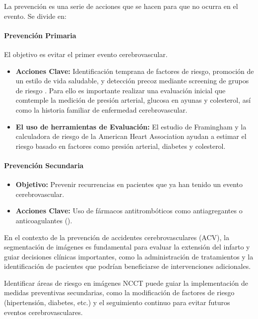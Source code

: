 La prevención es una serie de acciones que se hacen para que no ocurra en el evento. Se divide en:

\paragraph{Prevención Primaria}
El objetivo es evitar el primer evento cerebrovascular.
\begin{itemize}
    \item \textbf{Acciones Clave: } Identificación temprana de factores de riesgo, promoción de un estilo de vida saludable, y detección precoz mediante screening de grupos de riesgo \cite{incn2018}. Para ello es importante realizar una evaluación inicial que comtemple la medición de presión arterial, glucosa en ayunas y colesterol, así como la historia familiar de enfermedad cerebrovascular.

    \item \textbf{El uso de herramientas de Evaluación: } El estudio de Framingham y la calculadora de riesgo de la American Heart Association ayudan a estimar el riesgo basado en factores como presión arterial, diabetes y colesterol.
\end{itemize}

\paragraph{Prevención Secundaria}
\begin{itemize}
    \item \textbf{Objetivo:} Prevenir recurrencias en pacientes que ya han tenido un evento cerebrovascular.
    \item \textbf{Acciones Clave:} Uso de fármacos antitrombóticos como antiagregantes o anticoagulantes (\cite{incn2018}).
\end{itemize}

En el contexto de la prevención de accidentes cerebrovasculares (ACV), la segmentación de imágenes es fundamental para evaluar la extensión del infarto y guiar decisiones clínicas importantes, como la administración de tratamientos y la identificación de pacientes que podrían beneficiarse de intervenciones adicionales.
\newline

Identificar áreas de riesgo en imágenes NCCT puede guiar la implementación de medidas preventivas secundarias, como la modificación de factores de riesgo (hipertensión, diabetes, etc.) y el seguimiento continuo para evitar futuros eventos cerebrovasculares.
\newline

